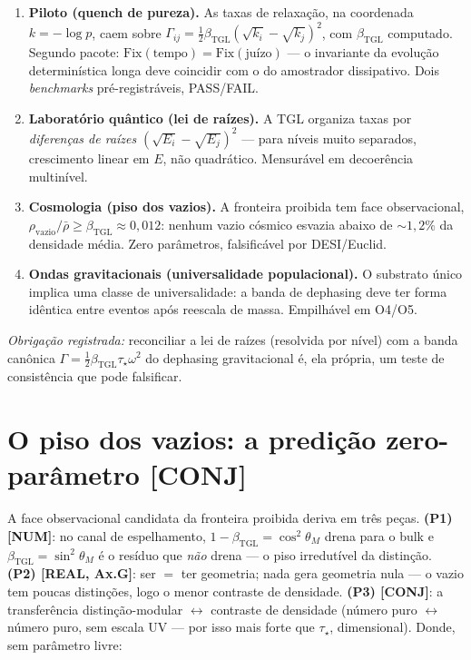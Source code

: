 \documentclass[11pt]{article}
\newcommand{\bTGL}{\beta_{\mathrm{TGL}}}\newcommand{\Msun}{M_{\odot}}\newcommand{\TGL}{\mathrm{TGL}}
\theoremstyle{definition}\newtheorem{deriv}{Derivação}
\begin{document}
\begin{enumerate}

\item \textbf{Piloto (quench de pureza).} As taxas de relaxação, na coordenada $k=-\log p$, caem sobre $\Gamma_{ij}=\tfrac12\bTGL(\sqrt{k_i}-\sqrt{k_j})^2$, com $\bTGL$ computado. Segundo pacote: $\mathrm{Fix}(\text{tempo})=\mathrm{Fix}(\text{juízo})$ --- o invariante da evolução determinística longa deve coincidir com o do amostrador dissipativo. Dois \emph{benchmarks} pré-registráveis, PASS/FAIL.

\item \textbf{Laboratório quântico (lei de raízes).} A TGL organiza taxas por \emph{diferenças de raízes} $(\sqrt{E_i}-\sqrt{E_j})^2$ --- para níveis muito separados, crescimento linear em $E$, não quadrático. Mensurável em decoerência multinível.

\item \textbf{Cosmologia (piso dos vazios).} A fronteira proibida tem face observacional, $\rho_{\mathrm{vazio}}/\bar\rho\geq\bTGL\approx0{,}012$: nenhum vazio cósmico esvazia abaixo de $\sim1{,}2\%$ da densidade média. Zero parâmetros, falsificável por DESI/Euclid.

\item \textbf{Ondas gravitacionais (universalidade populacional).} O substrato único implica uma classe de universalidade: a banda de dephasing deve ter forma idêntica entre eventos após reescala de massa. Empilhável em O4/O5.

\end{enumerate}

\emph{Obrigação registrada:} reconciliar a lei de raízes (resolvida por nível) com a banda canônica $\Gamma=\tfrac12\bTGL\tau_\star\omega^2$ do dephasing gravitacional é, ela própria, um teste de consistência que pode falsificar.

\section{O piso dos vazios: a predição zero-parâmetro \textsf{[CONJ]}}

A face observacional candidata da fronteira proibida deriva em três peças. \textbf{(P1) \textsf{[NUM]}}: no canal de espelhamento, $1-\bTGL=\cos^2\theta_M$ drena para o bulk e $\bTGL=\sin^2\theta_M$ é o resíduo que \emph{não} drena --- o piso irredutível da distinção. \textbf{(P2) \textsf{[REAL, Ax.G]}}: ser $=$ ter geometria; nada gera geometria nula --- o vazio tem poucas distinções, logo o menor contraste de densidade. \textbf{(P3) \textsf{[CONJ]}}: a transferência distinção-modular $\leftrightarrow$ contraste de densidade (número puro $\leftrightarrow$ número puro, sem escala UV --- por isso mais forte que $\tau_\star$, dimensional). Donde, sem parâmetro livre:
\end{document}
